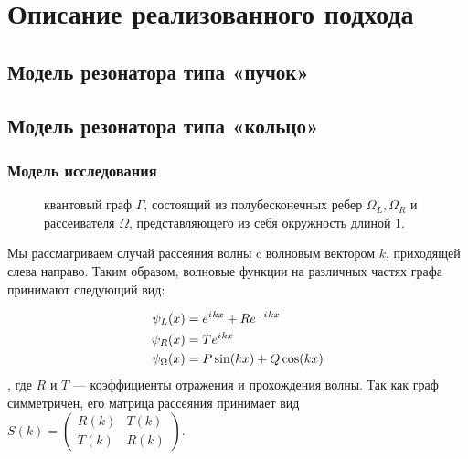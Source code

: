 \chapter{Описание реализованного подхода}
\label{chapter2}

\section{Модель резонатора типа «пучок»} %




\section{Модель резонатора типа «кольцо»}

\subsection{Модель исследования}
\begin{figure}[!htb] %
\begin{tikzpicture}[scale=0.8] %

\end{tikzpicture}
\caption{квантовый граф $\Gamma$, состоящий из полубесконечных ребер $\Omega_L, \Omega_R$ и рассеивателя $\Omega$, представляющего из себя окружность длиной $1$.}
\end{figure}

Мы рассматриваем случай рассеяния волны c волновым вектором $k$, приходящей слева направо. Таким образом, волновые функции на различных частях графа принимают следующий вид:

\begin{equation}\label{eq:ring_system}
\begin{aligned}
\psi_L(x) &= \eexp{\iu k x} + R \eexp{-\iu k x} \\
\psi_R(x) &= T \eexp{\iu k x}\\
\psi_\Omega(x) &= P \sin(k x) + Q \cos(k x)
\end{aligned}
\end{equation}
, где $R$ и $T$ — коэффициенты отражения и прохождения волны. Так как граф симметричен, его матрица рассеяния принимает вид
$S(k) = \begin{pmatrix} R(k) & T(k) \\ T(k) & R(k) \end{pmatrix}$.

